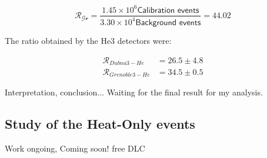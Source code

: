 \begin{equation}
\mathcal{R_{Ge}} = \frac{ 1.45 \times 10^6 \textsf{Calibration events} }{ 3.30 \times 10^4 \textsf{Background events} } = 44.02
\end{equation}

The ratio obtained by the He3 detectors were:

\begin{equation}
\begin{array}{cc}
\mathcal{R}_{Dubna 3-He} &= 26.5 \pm 4.8 \\
\mathcal{R}_{Grenoble 3-He} &= 34.5 \pm 0.5
\end{array}
\end{equation}

{\color{red} Interpretation, conclusion... Waiting for the final result for my analysis.}

\subsection{Study of the Heat-Only events}

{\color{red} Work ongoing, Coming soon! free DLC}
